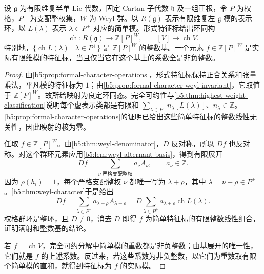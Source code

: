 \begin{proposition}[表示环的特征标同构]\label{b5:prop:lie-character-ring-isomorphism}
	设 \(\mathfrak g\) 为有限维复半单 Lie 代数，固定 Cartan 子代数 \(\mathfrak h\) 及一组正根，令 \(P\) 为权格，\(P^+\) 为支配整权集，\(W\) 为 Weyl 群。以 \(R(\mathfrak g)\) 表示有限维复左 \(\mathfrak g\) 模的表示环，以 \(L(\lambda)\) 表示 \(\lambda\in P^+\) 对应的简单模。形式特征标给出环同构
	\[
		\operatorname{ch}:R(\mathfrak g)\longrightarrow\mathbb Z[P]^W, \qquad [V]\longmapsto\operatorname{ch}V.
	\]
	特别地，\(\{\operatorname{ch}L(\lambda)\mid\lambda\in P^+\}\) 是 \(\mathbb Z[P]^W\) 的整数基。一个元素 \(f\in\mathbb Z[P]^W\) 是实际有限维模的特征标，当且仅当它在这个基上的系数全是非负整数。
\end{proposition}
\begin{proof}
	由\cref{b5:prop:formal-character-operations}，形式特征标保持正合关系和张量乘法，平凡模的特征标为 \(1\)；由\cref{b5:prop:formal-character-weyl-invariant}，它取值于 \(\mathbb Z[P]^W\)。故所给映射为良定环同态。完全可约性与\cref{b5:thm:highest-weight-classification}说明每个虚表示类都是有限和 \(\sum_{\lambda\in P^+}n_\lambda[L(\lambda)]\)、\(n_\lambda\in\mathbb Z\)。\cref{b5:prop:formal-character-operations}的证明已给出这些简单特征标的整数线性无关性，因此映射的核为零。

	任取 \(f\in\mathbb Z[P]^W\)。由\cref{b5:thm:weyl-denominator}，\(D\) 反对称，所以 \(Df\) 也反对称。对这个群环元素应用\cref{b5:lem:weyl-alternant-basis}，得到有限展开
	\[
		Df=\sum_{\nu\text{ 严格支配整权}}a_\nu A_\nu, \qquad a_\nu\in\mathbb Z.
	\]
	因为 \(\rho(h_i)=1\)，每个严格支配整权 \(\nu\) 都唯一写为 \(\lambda+\rho\)，其中 \(\lambda=\nu-\rho\in P^+\)。\cref{b5:thm:weyl-character}于是给出
	\[
		Df=\sum_{\lambda\in P^+}a_{\lambda+\rho}A_{\lambda+\rho} =D\sum_{\lambda\in P^+}a_{\lambda+\rho}\operatorname{ch}L(\lambda).
	\]
	权格群环是整环，且 \(D\ne0\)，消去 \(D\) 即得 \(f\) 为简单特征标的有限整数线性组合，证明满射和整数基的结论。

	若 \(f=\operatorname{ch}V\)，完全可约分解中简单模的重数都是非负整数；由基展开的唯一性，它们就是 \(f\) 的上述系数。反过来，若这些系数为非负整数，以它们为重数取有限个简单模的直和，就得到特征标为 \(f\) 的实际模。
\end{proof}


